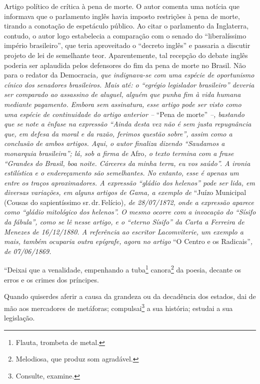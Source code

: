 \begin{didascalia}
Artigo político de crítica à pena de morte. O autor comenta uma notícia
que informava que o parlamento inglês havia imposto restrições à pena de
morte, tirando a conotação de espetáculo público. Ao citar o parlamento
da Inglaterra, contudo, o autor logo estabelecia a comparação com o
senado do ``liberalíssimo império brasileiro'', que teria aproveitado o
``decreto inglês'' e passaria a discutir projeto de lei de semelhante
teor. Aparentemente, tal recepção do debate inglês poderia ser aplaudida
pelos defensores do fim da pena de morte no Brasil. Não para o redator
da Democracia\emph{, que indignava-se com uma espécie de oportunismo
cínico dos senadores brasileiros. Mais até: o ``egrégio legislador
brasileiro'' deveria ser comparado ao assassino de aluguel, alguém que
punha fim à vida humana mediante pagamento. Embora sem assinatura, esse
artigo pode ser visto como uma espécie de continuidade do artigo
anterior --} ``Pena de morte'' \emph{--, bastando que se note a ênfase na
expressão ``Ainda desta vez não é sem justa repugnância que, em defesa da
moral e da razão, ferimos questão sobre'', assim como a conclusão de
ambos artigos. Aqui, o autor finaliza dizendo ``Saudamos a monarquia
brasileira''; lá, sob a firma de} Afro\emph{, o texto termina com a frase
``Grandes do Brasil, boa noite. Cárceres da minha terra, eu vos saúdo''. A
ironia estilística e o endereçamento são semelhantes. No entanto, esse é
apenas um entre os traços aproximadores. A expressão ``gládio dos
helenos'' pode ser lida, em diversas variações, em alguns artigos de
Gama, a exemplo de} ``Juízo Municipal (Cousas do sapientíssimo sr.\,dr.\,Felício)\emph{, de 28/07/1872, onde a expressão aparece como ``gládio
mitológico dos helenos''. O mesmo ocorre com a invocação do ``Sísifo da
fábula'', como se lê nesse artigo, e o ``eterno Sísifo'' da Carta a
Ferreira de Menezes de 16/12/1880. A referência ao escritor
Lacomviterie, um exemplo a mais, também ocuparia outra epígrafe, agora
no artigo} ``O Centro e os Radicais''\emph{, de 07/06/1869.}
\end{didascalia}



``Deixai que a venalidade, empenhando a tuba\footnote{Flauta, trombeta
  de metal.} canora\footnote{Melodiosa, que produz som agradável.} da
poesia, decante os erros e os crimes dos príncipes.

Quando quiserdes aferir a causa da grandeza ou da decadência dos
estados, dai de mão aos mercadores de metáforas; compulsai\footnote{
  Consulte, examine.} a sua história; estudai a sua legislação.

